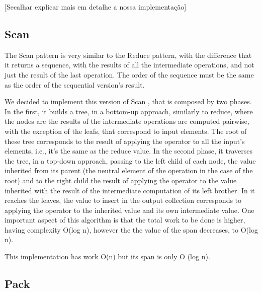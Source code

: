 \documentclass[conference,compsoc]{IEEEtran}
\begin{document}
[Secalhar explicar mais em detalhe a nossa implementação]



\subsection{Scan}

The Scan pattern is very similar to the Reduce pattern,
with the difference that it returns a sequence, with the results of all the intermediate operations, and not just the result of the last operation.
The order of the sequence must be the same as the order of the sequential version's result.

We decided to implement this version of Scan \cite{ladner1980parallel}, that is composed by two phases.
In the first, it builds a tree, in a bottom-up approach, similarly to reduce, where the nodes are the results of the intermediate operations are computed pairwise, with the exception of the leafs, that correspond to input elements. The root of these tree corresponds to the result of applying the operator to all the input's elements, i.e., it's the same as the reduce value.
In the second phase, it traverses the tree, in a top-down approach, passing to the left child of each node, the value inherited from its parent (the neutral element of the operation in the case of the root) and to the right child the result of applying the operator to the value inherited with the result of the intermediate computation of its left brother. In it reaches the leaves, the value to insert in the output collection corresponds to applying the operator to the inherited value and its own intermediate value.
One important aspect of this algorithm is that the total work to be done is higher, having complexity O(log n), however the the value of the span decreases, to O(log n).

This implementation has work O(n) but its span is only O (log n).

\subsection{Pack}
\end{document}
